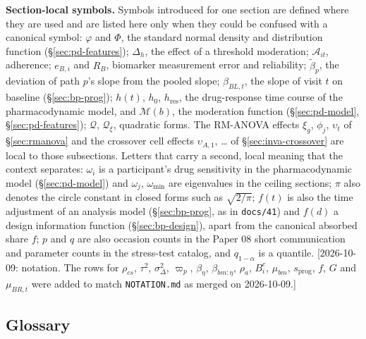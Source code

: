 \documentclass[11pt]{article}
\newcommand{\note}[1]{\textcolor{blue!60!black}{\small [#1]}}
\newcommand{\code}[1]{\texttt{#1}}
\begin{document}
\textbf{Section-local symbols.} Symbols introduced for one section are
defined where they are used and are listed here only when they could
be confused with a canonical symbol: $\varphi$ and $\Phi$, the standard
normal density and distribution function (\S\ref{sec:pd-features});
$\Delta_h$, the effect of a threshold moderation; $\mathcal A_{it}$,
adherence; $e_{B,i}$ and $R_B$, biomarker measurement error and
reliability; $\tilde\beta_p$, the deviation of path $p$'s slope from
the pooled slope; $\beta_{BL,t}$, the slope of visit $t$ on baseline
(\S\ref{sec:bp-prog}); $h(t)$, $h_0$, $h_{\text{res}}$, the
drug-response time course of the pharmacodynamic model, and
$\mathcal M(b)$, the moderation function (\S\ref{sec:pd-model},
\S\ref{sec:pd-features}); $\mathcal Q$, $\mathcal Q_\xi$, quadratic
forms. The RM-ANOVA effects $\xi_g$, $\phi_j$, $\upsilon_t$ of
\S\ref{sec:rmanova} and the crossover cell effects $\upsilon_{A,1}$,
\dots{} of \S\ref{sec:inva-crossover} are local to those subsections.
Letters that carry a second, local meaning that the context separates:
$\omega_i$ is a participant's drug sensitivity in the pharmacodynamic
model (\S\ref{sec:pd-model}) and $\omega_j$, $\omega_{\min}$ are
eigenvalues in the ceiling sections; $\pi$ also denotes the circle
constant in closed forms such as $\sqrt{2/\pi}$; $f(t)$ is also the
time adjustment of an analysis model (\S\ref{sec:bp-prog}, as in
\code{docs/41}) and $f(d)$ a design information function
(\S\ref{sec:bp-design}), apart from the canonical absorbed share $f$;
$p$ and $q$ are also occasion counts in the Paper 08 short
communication and parameter counts in the stress-test catalog, and
$q_{1-\alpha}$ is a quantile. \note{2026-10-09: notation. The rows for
$\rho_{cs}$, $\tau^2$, $\sigma_\Delta^2$, $\varpi_p$, $\beta_\eta$,
$\beta_{bm:\eta}$, $\rho_a$, $B^c_i$, $\mu_{bm}$, $s_{\text{prog}}$,
$f$, $G$ and $\mu_{BR,t}$ were added to match \code{NOTATION.md} as
merged on 2026-10-09.}

\subsection{Glossary}
\label{sec:glossary}
\end{document}
